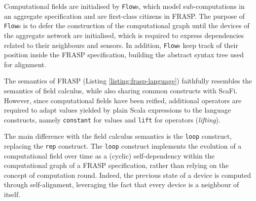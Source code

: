 Computational fields are initialised by \texttt{Flow}s, which model
sub-computations in an aggregate specification and are first-class citizens in
FRASP. The purpose of \texttt{Flow}s is to defer the construction of the
computational graph until the devices of the aggregate network are initialised,
which is required to express dependencies related to their neighbours and
sensors. In addition, \texttt{Flow}s keep track of their position inside the
FRASP specification, building the abstract syntax tree used for alignment.

The semantics of FRASP (Listing \ref{listing:frasp-language}) faithfully
resembles the semantics of field calculus, while also sharing common constructs
with \ac{ScaFi}. However, since computational fields have been reified,
additional operators are required to adapt values yielded by plain Scala
expressions to the language constructs, namely \texttt{constant} for values and
\texttt{lift} for operators (\textit{lifting}).

The main difference with the field calculus semantics is the \texttt{loop}
construct, replacing the \texttt{rep} construct. The \texttt{loop} construct
implements the evolution of a computational field over time as a (cyclic)
self-dependency within the computational graph of a FRASP specification, rather
than relying on the concept of computation round. Indeed, the previous state of
a device is computed through self-alignment, leveraging the fact that every
device is a neighbour of itself.



